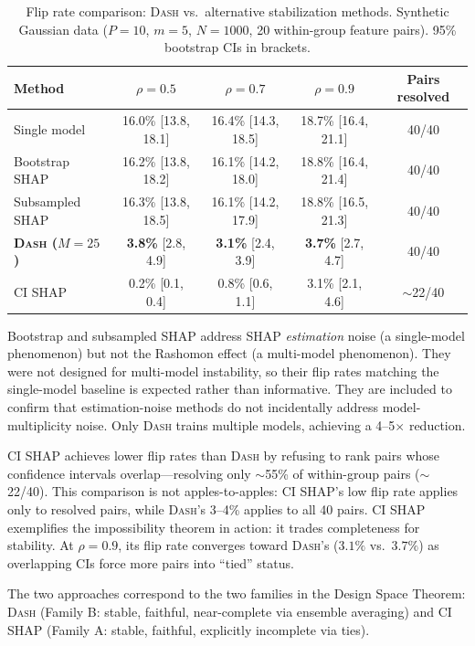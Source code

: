 \documentclass{jmlr}
\newcommand{\DASH}{\textsc{Dash}}
\begin{document}
\begin{table}[t]
\centering
\caption{Flip rate comparison: \DASH{} vs.\ alternative stabilization methods. Synthetic Gaussian data ($P{=}10$, $m{=}5$, $N{=}1000$, 20 within-group feature pairs). 95\% bootstrap CIs in brackets.}
\label{tab:dash-benchmark}
\small
\begin{tabular}{@{}lcccc@{}}
\toprule
Method & $\rho = 0.5$ & $\rho = 0.7$ & $\rho = 0.9$ & Pairs resolved \\
\midrule
Single model       & 16.0\% [13.8, 18.1] & 16.4\% [14.3, 18.5] & 18.7\% [16.4, 21.1] & 40/40 \\
Bootstrap SHAP     & 16.2\% [13.8, 18.2] & 16.1\% [14.2, 18.0] & 18.8\% [16.4, 21.4] & 40/40 \\
Subsampled SHAP    & 16.3\% [13.8, 18.5] & 16.1\% [14.2, 17.9] & 18.8\% [16.5, 21.3]  & 40/40 \\
\textbf{\DASH{} ($M{=}25$)} & \textbf{3.8\%} [2.8, 4.9] & \textbf{3.1\%} [2.4, 3.9] & \textbf{3.7\%} [2.7, 4.7] & 40/40 \\
CI SHAP            & 0.2\% [0.1, 0.4]    & 0.8\% [0.6, 1.1]    & 3.1\% [2.1, 4.6]     & $\sim$22/40 \\
\bottomrule
\end{tabular}
\end{table}

Bootstrap and subsampled SHAP address SHAP \emph{estimation} noise (a single-model phenomenon) but not the Rashomon effect (a multi-model phenomenon). They were not designed for multi-model instability, so their flip rates matching the single-model baseline is expected rather than informative. They are included to confirm that estimation-noise methods do not incidentally address model-multiplicity noise. Only \DASH{} trains multiple models, achieving a 4--5$\times$ reduction.

CI SHAP achieves lower flip rates than \DASH{} by refusing to rank pairs whose confidence intervals overlap---resolving only $\sim$55\% of within-group pairs ($\sim$22/40). This comparison is not apples-to-apples: CI SHAP's low flip rate applies only to resolved pairs, while \DASH{}'s 3--4\% applies to all 40 pairs. CI SHAP exemplifies the impossibility theorem in action: it trades completeness for stability. At $\rho = 0.9$, its flip rate converges toward \DASH{}'s ($3.1\%$ vs.\ $3.7\%$) as overlapping CIs force more pairs into ``tied'' status.

The two approaches correspond to the two families in the Design Space Theorem: \DASH{} (Family B: stable, faithful, near-complete via ensemble averaging) and CI SHAP (Family A: stable, faithful, explicitly incomplete via ties).
\end{document}
